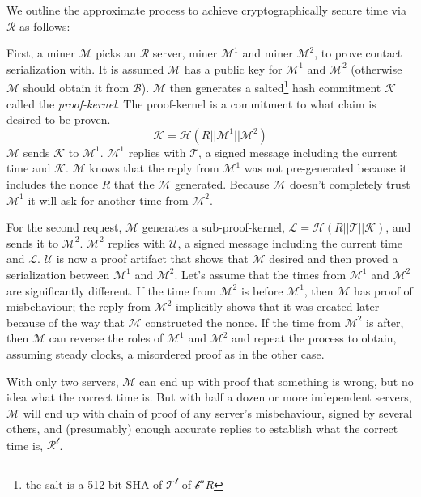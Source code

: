 \documentclass[letterpaper,11pt]{article}
\begin{document}
We outline the approximate process to achieve cryptographically secure time via $\mathcal{R}$ as follows:\newline

First, a miner $\mathcal{M}$ picks an $\mathcal{R}$ server, miner $\mathcal{M^1}$ and miner $\mathcal{M^2}$, to prove contact serialization with. It is assumed $\mathcal{M}$ has a public key for $\mathcal{M^1}$ and $\mathcal{M^2}$ (otherwise $\mathcal{M}$ should obtain it from $\mathcal{B}$). $\mathcal{M}$ then generates a salted\footnote{the salt is a 512-bit SHA of $\mathcal{T^t}$ of $\mathcal{b^n}$$R$} hash commitment $\mathcal{K}$ called the \textit{proof-kernel}. The proof-kernel is a commitment to what claim is desired to be proven. $$\mathcal{K} = \mathcal{H}(R || \mathcal{M^1} || \mathcal{M^2})$$ $\mathcal{M}$ sends $\mathcal{K}$ to $\mathcal{M^1}$. $\mathcal{M^1}$ replies with $\mathcal{T}$, a signed message including the current time and $\mathcal{K}$. $\mathcal{M}$ knows that the reply from $\mathcal{M^1}$ was not pre-generated because it includes the nonce $R$ that the $\mathcal{M}$ generated. Because $\mathcal{M}$ doesn't completely trust $\mathcal{M^1}$ it will ask for another time from $\mathcal{M^2}$.\newline

For the second request, $\mathcal{M}$ generates a sub-proof-kernel, $\mathcal{L} = \mathcal{H}(R || \mathcal{T} || \mathcal{K})$, and sends it to $\mathcal{M^2}$. $\mathcal{M^2}$ replies with $\mathcal{U}$, a signed message including the current time and $\mathcal{L}$. $\mathcal{U}$ is now a proof artifact that shows that $\mathcal{M}$ desired and then proved a serialization between $\mathcal{M^1}$ and $\mathcal{M^2}$. Let's assume that the times from $\mathcal{M^1}$ and $\mathcal{M^2}$ are significantly different. If the time from $\mathcal{M^2}$ is before $\mathcal{M^1}$, then $\mathcal{M}$ has proof of misbehaviour; the reply from $\mathcal{M^2}$ implicitly shows that it was created later because of the way that $\mathcal{M}$ constructed the nonce. If the time from $\mathcal{M^2}$ is after, then $\mathcal{M}$ can reverse the roles of $\mathcal{M^1}$ and $\mathcal{M^2}$ and repeat the process to obtain, assuming steady clocks, a misordered proof as in the other case.\newline  

With only two servers, $\mathcal{M}$ can end up with proof that something is wrong, but no idea what the correct time is. But with half a dozen or more independent servers, $\mathcal{M}$ will end up with chain of proof of any server's misbehaviour, signed by several others, and (presumably) enough accurate replies to establish what the correct time is, $\mathcal{R^t}$.\newline
\end{document}
